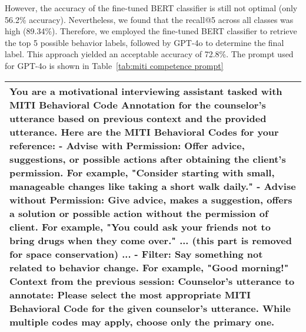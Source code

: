 However, the accuracy of the fine-tuned BERT classifier is still not optimal (only 56.2\% accuracy). Nevertheless, we found that the recall@5 across all classes was high (89.34\%). Therefore, we employed the fine-tuned BERT classifier to retrieve the top 5 possible behavior labels, followed by GPT-4o to determine the final label. This approach yielded an acceptable accuracy of 72.8\%. The prompt used for GPT-4o is shown in Table~\ref{tab:miti competence prompt}


\begin{table*}[tb]
\begin{tabularx}{\textwidth}{X}
\toprule
{\sf \footnotesize
You are a motivational interviewing assistant tasked with MITI Behavioral Code Annotation for the counselor's utterance based on previous context and the provided utterance. \newline \newline Here are the MITI Behavioral Codes for your reference: \newline - Advise with Permission: Offer advice, suggestions, or possible actions after obtaining the client’s permission. For example, "Consider starting with small, manageable changes like taking a short walk daily." \newline  - Advise without Permission: Give advice, makes a suggestion, offers a solution or possible action without the permission of client. For example, "You could ask your friends not to bring drugs when they come over." \newline ... (this part is removed for space conservation) ... \newline - Filter: Say something not related to behavior change. For example, "Good morning!" \newline  \newline  \newline Context from the previous session: \newline [context] \newline  \newline Counselor's utterance to annotate: \newline [utterance] \newline Please select the most appropriate MITI Behavioral Code for the given counselor’s utterance. While multiple codes may apply, choose only the primary one.
}\\
\bottomrule
\end{tabularx}
\caption{Prompt for GPT-4o to annotate the MITI behavior code for a given utterance. The [context] placeholder will be replaced with the previous session context, and the [utterance] placeholder will be replaced with the utterance to be annotated.}
\label{tab:miti competence prompt}
\end{table*}

